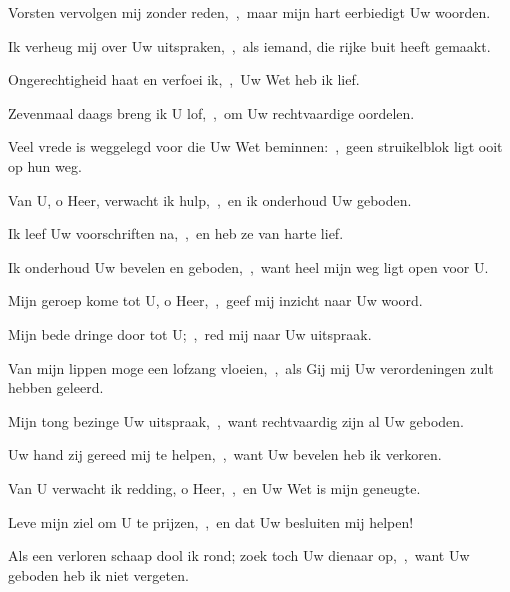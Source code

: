 \documentclass[12pt,twoside,a5paper]{article}
\begin{document}
\begin{halfparskip}
   

  Vorsten vervolgen mij zonder reden,~\sep\ maar mijn hart eerbiedigt Uw woorden.


  Ik verheug mij over Uw uitspraken,~\sep\ als iemand, die rijke buit heeft gemaakt.

  Ongerechtigheid haat en verfoei ik,~\sep\ Uw Wet heb ik lief.

  Zevenmaal daags breng ik U lof,~\sep\ om Uw rechtvaardige oordelen.

  Veel vrede is weggelegd voor die Uw Wet beminnen:~\sep\ geen struikelblok ligt ooit op hun weg.

  Van U, o Heer, verwacht ik hulp,~\sep\ en ik onderhoud Uw geboden.

  Ik leef Uw voorschriften na,~\sep\ en heb ze van harte lief.

  Ik onderhoud Uw bevelen en geboden,~\sep\ want heel mijn weg ligt open voor U.

   Mijn geroep kome tot U, o Heer,~\sep\ geef mij inzicht naar Uw woord.

  Mijn bede dringe door tot U;~\sep\ red mij naar Uw uitspraak.

  Van mijn lippen moge een lofzang vloeien,~\sep\ als Gij mij Uw verordeningen zult hebben geleerd.

  Mijn tong bezinge Uw uitspraak,~\sep\ want rechtvaardig zijn al Uw geboden.

  Uw hand zij gereed mij te helpen,~\sep\ want Uw bevelen heb ik verkoren.

  Van U verwacht ik redding, o Heer,~\sep\ en Uw Wet is mijn geneugte.

  Leve mijn ziel om U te prijzen,~\sep\ en dat Uw besluiten mij helpen!

  Als een verloren schaap dool ik rond; zoek toch Uw dienaar op,~\sep\ want Uw geboden heb ik niet vergeten.
\end{halfparskip}

\begin{halfparskip}
   
\end{halfparskip}

\end{document}
